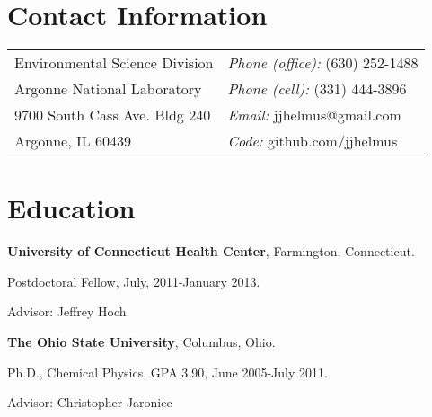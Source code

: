 \documentclass[margin,line]{res}
\newenvironment{list1}{
  \begin{list}{\ding{113}}{%
      \setlength{\itemsep}{0in}
      \setlength{\parsep}{0in} \setlength{\parskip}{0in}
      \setlength{\topsep}{0in} \setlength{\partopsep}{0in} 
      \setlength{\leftmargin}{0.17in}}}{\end{list}}
\begin{document}

\begin{resume}
\section{\sc Contact Information}



\begin{tabular}{@{}p{2in}p{4in}}
Environmental Science Division  & {\it Phone (office):}  (630) 252-1488 \\            
Argonne National Laboratory     & {\it Phone (cell):}  (331) 444-3896\\
9700 South Cass Ave. Bldg 240   & {\it Email:} jjhelmus@gmail.com\\
Argonne, IL 60439               & {\it Code:} github.com/jjhelmus\\
\end{tabular}


\section{\sc Education}

{\bf University of Connecticut Health Center}, Farmington, Connecticut.
\begin{list1}
\item[] Postdoctoral Fellow, July, 2011-January 2013.
\item[] Advisor: Jeffrey Hoch.
\end{list1}
\vspace{-0.1in}


{\bf The Ohio State University}, Columbus, Ohio.
\begin{list1}
\item[] Ph.D., Chemical Physics, GPA 3.90, June 2005-July 2011.
\item[] Advisor:  Christopher Jaroniec
\end{list1}
\vspace{-0.1in}


\end{resume}
\end{document}
